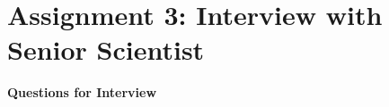 \documentclass[12pt]{extarticle}
\begin{document}
\section*{Assignment 3: Interview with Senior Scientist}

\vspace{5mm}
\begin{center}
     \par
\end{center}
\vspace{5mm}

\textbf{Questions for Interview}
\end{document}

